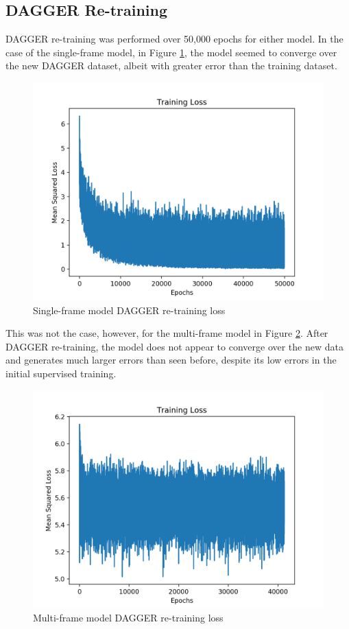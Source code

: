 \documentclass[conference]{IEEEtran}
\begin{document}
\subsection{DAGGER Re-training}
DAGGER re-training was performed over 50,000 epochs for either model. In the case of the single-frame 
model, in Figure \ref{fig:dagger_single}, the model seemed to converge over the new DAGGER dataset, albeit with greater error than 
the training dataset. 
\begin{figure}[H]
  \centering
    \includegraphics[scale=0.28]{single_dagger.png}
  \caption{Single-frame model DAGGER re-training loss}
  \label{fig:dagger_single}
\end{figure}
This was not the case, however, for the multi-frame model in Figure \ref{fig:dagger_multi}. After DAGGER re-training, the model does not appear
to converge over the new data and generates much larger errors than seen before, despite its low errors
in the initial supervised training.
\begin{figure}[H]
  \centering
    \includegraphics[scale=0.28]{multi_dagger.png}
  \caption{Multi-frame model DAGGER re-training loss}
  \label{fig:dagger_multi}
\end{figure}
\end{document}
